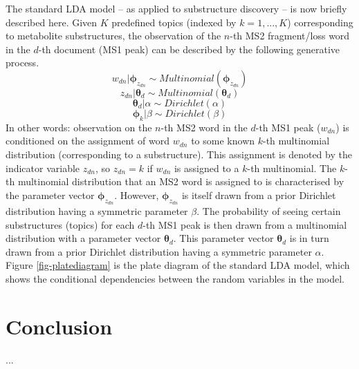 The standard LDA model -- as applied to substructure discovery -- is now briefly described here. Given $K$ predefined topics (indexed by $k=1,...,K$) corresponding to metabolite substructures, the observation of the $n$-th MS2 fragment/loss word in the $d$-th document (MS1 peak) can be described by the following generative process.
\begin{equation}
w_{dn}|\boldsymbol{\phi}_{z_{dn}}\sim Multinomial(\boldsymbol{\phi}_{z_{dn}})
\end{equation}
\begin{equation}
z_{dn}|\boldsymbol{\theta}_{d}\sim Multinomial(\boldsymbol{\theta}_{d})
\end{equation}
\begin{equation}
\boldsymbol{\theta}_{d}|\alpha\sim Dirichlet(\alpha)
\end{equation}
\begin{equation}
\boldsymbol{\phi}_{k}|\beta\sim Dirichlet(\beta)
\end{equation}
In other words: observation on the $n$-th MS2 word in the $d$-th MS1 peak ($w_{dn}$) is conditioned on the assignment of word $w_{dn}$ to some known $k$-th multinomial distribution (corresponding to a substructure). This assignment is denoted by the indicator variable $z_{dn}$, so $z_{dn}=k$ if $w_{dn}$ is assigned to a $k$-th multinomial. The $k$-th multinomial distribution that an MS2 word is assigned to is characterised by the parameter vector $\boldsymbol{\phi}_{z_{dn}}$. However, $\boldsymbol{\phi}_{z_{dn}}$ is itself drawn from a prior Dirichlet distribution having a symmetric parameter $\beta$. The probability of seeing certain substructures (topics) for each $d$-th MS1 peak is then drawn from a multinomial distribution with a parameter vector $\boldsymbol{\theta}_{d}$. This parameter vector $\boldsymbol{\theta}_{d}$ is in turn drawn from a prior Dirichlet distribution having a symmetric parameter $\alpha$. Figure \ref{fig-platediagram} is the plate diagram of the standard LDA model, which shows the conditional dependencies between the random variables in the model.

\section{Conclusion}

...
